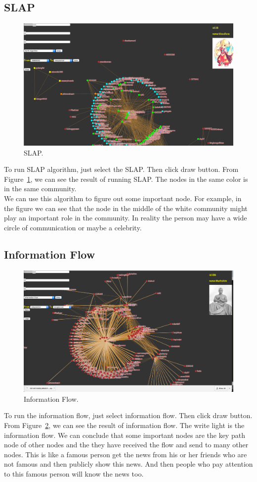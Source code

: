 \documentclass{article}
\begin{document}
\subsection{SLAP}
\begin{figure}[H]
  \centering
  \includegraphics[width=0.75\columnwidth]{slap.png}
  \caption{SLAP.}
  \label{fig:slap}
\end{figure}
To run SLAP algorithm, just select the SLAP. Then click draw button. From Figure~\ref{fig:slap}, we can see the result of running SLAP. The nodes in the same color is in the same community. \\ 
We can use this algorithm to figure out some important node. For example, in the figure we can see that the node in the middle of the white community might play an important role in the community. In reality the person may have a wide circle of communication or maybe a celebrity.

\subsection{Information Flow}
\begin{figure}[H]
  \centering
  \includegraphics[width=0.75\columnwidth]{if.png}
  \caption{Information Flow.}
  \label{fig:if}
\end{figure}
To run the information flow, just select information flow. Then click draw button. From Figure~\ref{fig:if}, we can see the result of information flow. The write light is the information flow. We can conclude that some important nodes are the key path node of other nodes and the they have received the flow and send to many other nodes. This is like a famous person get the news from his or her friends who are not famous and then publicly show this news. And then people who pay attention to this famous person will know the news too.\\
\end{document}
